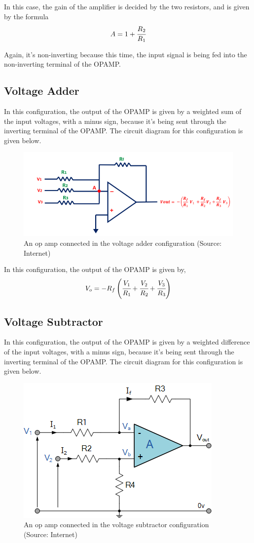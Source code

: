 \documentclass[10pt]{scrartcl}
\theoremstyle{definition}
\begin{document}
In this case, the gain of the amplifier is decided by the two resistors, and is given by the formula
$$A = 1 + \cfrac{R_2}{R_1}$$

Again, it's non-inverting because this time, the input signal is being fed into the non-inverting terminal
of the OPAMP.
\clearpage
\subsection{Voltage Adder}
In this configuration, the output of the OPAMP is given by a weighted sum of the input voltages, 
with a minus sign, because it's being sent through the inverting terminal of the OPAMP. The
circuit diagram for this configuration is given below.

\begin{figure}[!h]
    \centering
    \includegraphics[width=0.7\linewidth]{adder.png}
    \caption{An op amp connected in the voltage adder configuration (Source: Internet)}
\end{figure}

In this configuration, the output of the OPAMP is given by, 
$$V_o = -R_f\left(\cfrac{V_1}{R_1} + \cfrac{V_2}{R_2} + \cfrac{V_3}{R_3}\right)$$
\subsection{Voltage Subtractor}
In this configuration, the output of the OPAMP is given by a weighted difference of the input voltages, 
with a minus sign, because it's being sent through the inverting terminal of the OPAMP. The
circuit diagram for this configuration is given below.

\begin{figure}[!h]
    \centering
    \includegraphics[width=0.4\linewidth]{subtractor.png}
    \caption{An op amp connected in the voltage subtractor configuration (Source: Internet)}
\end{figure}
\end{document}
